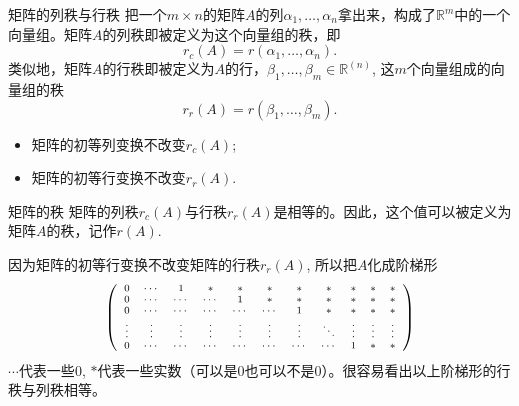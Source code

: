 \begin{frame}

\begin{block}{矩阵的列秩与行秩}
把一个$m\times n$的矩阵$A$的列$\alpha_1, \ldots, \alpha_n$拿出来，构成了$\mathbb{R}^m$中的一个向量组。矩阵$A$的列秩即被定义为这个向量组的秩，即
\[r_c(A) = r(\alpha_1, \ldots, \alpha_n).\]
类似地，矩阵$A$的行秩即被定义为$A$的行，$\beta_1, \ldots, \beta_m \in \mathbb{R}^{(n)}$, 这$m$个向量组成的向量组的秩
\[r_r(A) = r(\beta_1, \ldots, \beta_m).\]
\end{block}

\pause

\begin{thm}
\begin{itemize}
\item 矩阵的初等列变换不改变$r_c(A)$;
\item 矩阵的初等行变换不改变$r_r(A)$.
\end{itemize}
\end{thm}

\end{frame}


\begin{frame}

\begin{block}{矩阵的秩}
矩阵的列秩$r_c(A)$与行秩$r_r(A)$是相等的。因此，这个值可以被定义为矩阵$A$的秩，记作$r(A)$.
\end{block}

\pause

因为矩阵的初等行变换不改变矩阵的行秩$r_r(A)$, 所以把$A$化成阶梯形
\[
\scriptsize
\left(\begin{array}{*{11}c}
0 & \cdots & 1 & * & * & * & * & * & * & * & * \\ 0 & \cdots & \cdots & \cdots & 1 & * & * & * & * & * & * \\ 0 & \cdots & \cdots & \cdots & \cdots & \cdots & 1 & * & * & * & * \\ \vdots & \vdots & \vdots & \vdots & \vdots & \vdots & \vdots & \ddots & \vdots & \vdots & \vdots\\ 0 & \cdots & \cdots & \cdots & \cdots & \cdots & \cdots & \cdots & 1 & * & * \end{array}\right)
\]
$\cdots$代表一些$0$, $*$代表一些实数（可以是$0$也可以不是$0$）。很容易看出以上阶梯形的行秩与列秩相等。

\end{frame}

